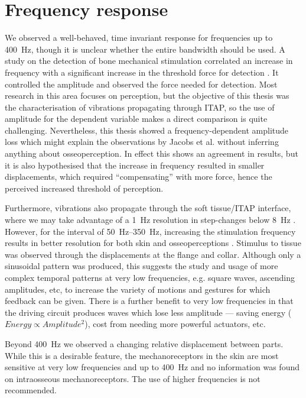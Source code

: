 \section{Frequency response}
We observed a well-behaved, time invariant response for frequencies up to \SI{400}{Hz}, though it is unclear whether the entire bandwidth should be used.
A study on the detection of bone mechanical stimulation correlated an increase in frequency with a significant increase in the threshold force for detection \cite{jacobs_evaluation_2000}.
It controlled the amplitude and observed the force needed for detection.
Most research in this area focuses on perception, but the objective of this thesis was the characterisation of vibrations propagating through ITAP, so the use of amplitude for the dependent variable makes a direct comparison is quite challenging.
Nevertheless, this thesis showed a frequency-dependent amplitude loss which might explain the observations by Jacobs et al. \cite{jacobs_evaluation_2000} without inferring anything about osseoperception.
In effect this shows an agreement in results, but it is also hypothesised that the increase in frequency resulted in smaller displacements, which required ``compensating'' with more force, hence the perceived increased threshold of perception.

Furthermore, vibrations also propagate through the soft tissue/ITAP interface, where we may take advantage of a \SI{1}{Hz} resolution in step-changes below \SI{8}{Hz} \cite{ChaubeyPravin2014Cvhf}.
However, for the interval of \SIrange{50}{350}{Hz}, increasing the stimulation frequency results in better resolution for both skin and osseoperceptions \cite{haggstrom_vibrotactile_2013,pylatiuk_progress_2004, shah_vibration_2019}.
Stimulus to tissue was observed through the displacements at the flange and collar.
Although only a sinusoidal pattern was produced, this suggests the study and usage of more complex temporal patterns at very low frequencies, e.g. square waves, ascending amplitudes, etc, to increase the variety of motions and gestures for which feedback can be given. 
There is a further benefit to very low frequencies in that the driving circuit produces waves which lose less amplitude --- saving energy ($Energy \propto Amplitude^2$), cost from needing more powerful actuators, etc.

Beyond \SI{400}{Hz} we observed a changing relative displacement between parts.
While this is a desirable feature, the mechanoreceptors in the skin are most sensitive at very low frequencies and up to \SI{400}{Hz} \cite{shah_vibration_2019} and no information was found on intraosseous mechanoreceptors.
The use of higher frequencies is not recommended.

